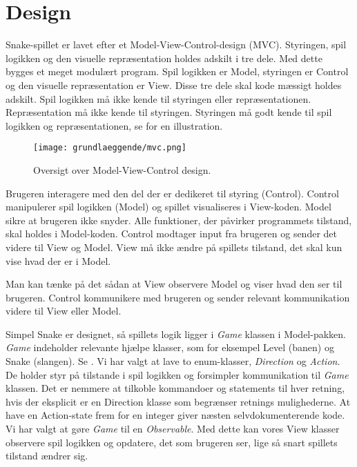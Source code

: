 \section{Design}
Snake-spillet er lavet efter et Model-View-Control-design (MVC). Styringen, spil logikken og den visuelle repræsentation holdes adskilt i tre dele. Med dette bygges et meget modulært program. Spil logikken er Model, styringen er Control og den visuelle repræsentation er View. Disse tre dele skal kode mæssigt holdes adskilt. Spil logikken må ikke kende til styringen eller repræsentationen. Repræsentation må ikke kende til styringen. Styringen må godt kende til spil logikken og repræsentationen, se  for en illustration.

\begin{figure}[h]
	\centering
   	\texttt{[image: grundlaeggende/mvc.png]}
	\hspace{0.1\textwidth}
	\caption{Oversigt over Model-View-Control design.}
\end{figure}

Brugeren interagere med den del der er dedikeret til styring (Control). Control manipulerer spil logikken (Model) og spillet visualiseres i View-koden. Model sikre at brugeren ikke snyder. Alle funktioner, der påvirker programmets tilstand, skal holdes i Model-koden. Control modtager input fra brugeren og sender det videre til View og Model. View må ikke ændre på spillets tilstand, det skal kun vise hvad der er i Model. 

Man kan tænke på det sådan at View observere Model og viser hvad den ser til brugeren. Control kommunikere med brugeren og sender relevant kommunikation videre til View eller Model.

Simpel Snake er designet, så spillets logik ligger i \textit{Game} klassen i Model-pakken. \textit{Game} indeholder relevante hjælpe klasser, som for eksempel Level (banen) og Snake (slangen). Se . Vi har valgt at lave to enum-klasser, \textit{Direction} og \textit{Action}. De holder styr på tilstande i spil logikken og forsimpler kommunikation til \textit{Game} klassen. Det er nemmere at tilkoble kommandoer og statements til hver retning, hvis der eksplicit er en Direction klasse som begrænser retnings mulighederne. At have en Action-state frem for en integer giver næsten selvdokumenterende kode. Vi har valgt at gøre \textit{Game} til en \textit{Observable}. Med dette kan vores View klasser observere spil logikken og opdatere, det som brugeren ser, lige så snart spillets tilstand ændrer sig.

